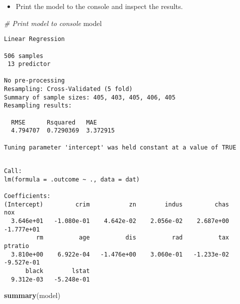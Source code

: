\documentclass[]{book}
\newenvironment{Shaded}{\begin{snugshade}}{\end{snugshade}}
\newcommand{\KeywordTok}[1]{\textcolor[rgb]{0.13,0.29,0.53}{\textbf{#1}}}
\newcommand{\CommentTok}[1]{\textcolor[rgb]{0.56,0.35,0.01}{\textit{#1}}}
\newcommand{\OperatorTok}[1]{\textcolor[rgb]{0.81,0.36,0.00}{\textbf{#1}}}
\newcommand{\NormalTok}[1]{#1}
\providecommand{\tightlist}{%
  \setlength{\itemsep}{0pt}\setlength{\parskip}{0pt}}
\begin{document}
\begin{itemize}
\tightlist
\item
  Print the model to the console and inspect the results.
\end{itemize}

\begin{Shaded}
\begin{Highlighting}[]
\CommentTok{# Print model to console}
\NormalTok{model}
\end{Highlighting}
\end{Shaded}

\begin{verbatim}
Linear Regression 

506 samples
 13 predictor

No pre-processing
Resampling: Cross-Validated (5 fold) 
Summary of sample sizes: 405, 403, 405, 406, 405 
Resampling results:

  RMSE      Rsquared   MAE     
  4.794707  0.7290369  3.372915

Tuning parameter 'intercept' was held constant at a value of TRUE
\end{verbatim}

\begin{Shaded}
\end{Shaded}

\begin{verbatim}

Call:
lm(formula = .outcome ~ ., data = dat)

Coefficients:
(Intercept)         crim           zn        indus         chas          nox  
  3.646e+01   -1.080e-01    4.642e-02    2.056e-02    2.687e+00   -1.777e+01  
         rm          age          dis          rad          tax      ptratio  
  3.810e+00    6.922e-04   -1.476e+00    3.060e-01   -1.233e-02   -9.527e-01  
      black        lstat  
  9.312e-03   -5.248e-01  
\end{verbatim}

\begin{Shaded}
\begin{Highlighting}[]
\KeywordTok{summary}\NormalTok{(model)}
\end{Highlighting}
\end{Shaded}
\end{document}

